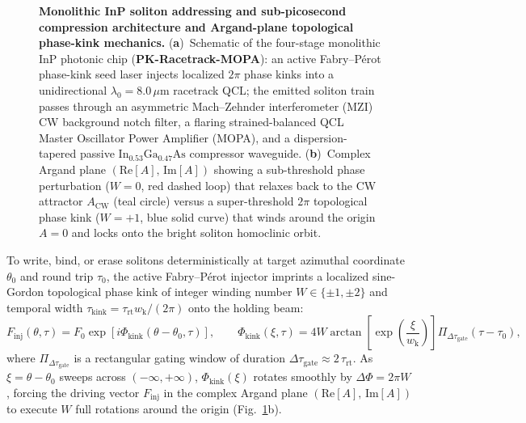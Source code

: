\documentclass[11pt,letterpaper]{article}
\begin{document}
\begin{figure}[t!]
\centering
\resizebox{0.97\textwidth}{!}{}
\caption{\textbf{Monolithic InP soliton addressing and sub-picosecond compression architecture and Argand-plane topological phase-kink mechanics.} (\textbf{a})~Schematic of the four-stage monolithic InP photonic chip (\textbf{PK-Racetrack-MOPA}): an active Fabry--P\'erot phase-kink seed laser injects localized $2\pi$ phase kinks into a unidirectional $\lambda_0 = 8.0\,\mu\mathrm{m}$ racetrack QCL; the emitted soliton train passes through an asymmetric Mach--Zehnder interferometer (MZI) CW background notch filter, a flaring strained-balanced QCL Master Oscillator Power Amplifier (MOPA), and a dispersion-tapered passive $\mathrm{In}_{0.53}\mathrm{Ga}_{0.47}\mathrm{As}$ compressor waveguide. (\textbf{b})~Complex Argand plane $(\mathrm{Re}[A],\,\mathrm{Im}[A])$ showing a sub-threshold phase perturbation ($W = 0$, red dashed loop) that relaxes back to the CW attractor $A_{\mathrm{CW}}$ (teal circle) versus a super-threshold $2\pi$ topological phase kink ($W = +1$, blue solid curve) that winds around the origin $A = 0$ and locks onto the bright soliton homoclinic orbit.}
\label{fig:chip_argand}
\end{figure}

To write, bind, or erase solitons deterministically at target azimuthal coordinate $\theta_0$ and round trip $\tau_0$, the active Fabry--P\'erot injector imprints a localized sine-Gordon topological phase kink of integer winding number $W \in \{\pm 1, \pm 2\}$ and temporal width $\tau_{\mathrm{kink}} = \tau_{\mathrm{rt}} w_{\mathrm{k}} / (2\pi)$ onto the holding beam:
\begin{equation}
F_{\mathrm{inj}}(\theta, \tau) = F_0 \exp\!\left[ i\Phi_{\mathrm{kink}}(\theta - \theta_0, \tau) \right], \qquad \Phi_{\mathrm{kink}}(\xi, \tau) = 4 W \arctan\!\left[ \exp\!\left( \frac{\xi}{w_{\mathrm{k}}} \right) \right] \Pi_{\Delta\tau_{\mathrm{gate}}}(\tau - \tau_0),
\label{eq:kink_seed}
\end{equation}
where $\Pi_{\Delta\tau_{\mathrm{gate}}}$ is a rectangular gating window of duration $\Delta\tau_{\mathrm{gate}} \approx 2\,\tau_{\mathrm{rt}}$. As $\xi = \theta - \theta_0$ sweeps across $(-\infty, +\infty)$, $\Phi_{\mathrm{kink}}(\xi)$ rotates smoothly by $\Delta\Phi = 2\pi W$, forcing the driving vector $F_{\mathrm{inj}}$ in the complex Argand plane $(\mathrm{Re}[A],\,\mathrm{Im}[A])$ to execute $W$ full rotations around the origin (Fig.~\ref{fig:chip_argand}b).
\end{document}
